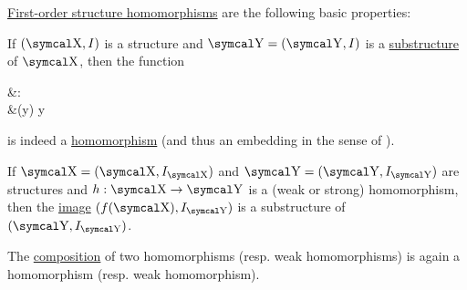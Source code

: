 \begin{proposition}\label{thm:first_order_homomorphism_properties}
  \hyperref[def:first_order_homomorphism]{First-order structure homomorphisms} are the following basic properties:
  \begin{PropEnum}
     If \( (\CX, I) \) is a structure and \( \CY = (\CY, I) \) is a \hyperref[def:first_order_substructure]{substructure} of \( \CX \), then the  function
    \begin{AlignedEquation}\label{thm:first_order_homomorphism_properties/substructure/canonical_embedding}
      &\iota: \CY \to \CX \\
      &\iota(y) \coloneqq y
    \end{AlignedEquation}
    is indeed a \hyperref[def:first_order_homomorphism_invertibility/projection]{homomorphism} (and thus an embedding in the sense of ).

     If \( \CX = (\CX, I_{\CX}) \) and \( \CY = (\CY, I_{\CY}) \) are structures and \( h: \CX \to \CY \) is a (weak or strong) homomorphism, then the \hyperref[def:function/image]{image} \( (f(\CX), I_{\CY}) \) is a substructure of \( (\CY, I_{\CY}) \).

     The \hyperref[def:function/composition]{composition} of two homomorphisms (resp. weak homomorphisms) is again a homomorphism (resp. weak homomorphism).
  \end{PropEnum}
\end{proposition}
